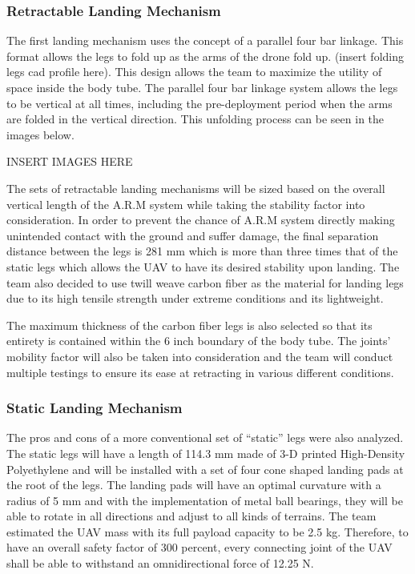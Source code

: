 		\subsubsection{Retractable Landing Mechanism}
			The first landing mechanism uses the concept of a parallel four bar linkage. This format allows the legs to fold up as the arms of the drone fold up. (insert folding legs cad profile here). This design allows the team to maximize the utility of space inside the body tube. The parallel four bar linkage system allows the legs to be vertical at all times, including the pre-deployment period when the arms are folded in the vertical direction. This unfolding process can be seen in the images below.

			INSERT IMAGES HERE

			The sets of retractable landing mechanisms will be sized based on the overall vertical length of the A.R.M system while taking the stability factor into consideration. In order to prevent the chance of A.R.M system directly making unintended contact with the ground and suffer damage, the final separation distance between the legs is 281 mm which is more than three times that of the static legs which allows the UAV to have its desired stability upon landing. The team also decided to use twill weave carbon fiber as the material for landing legs due to its high tensile strength under extreme conditions and its lightweight. 

			The maximum thickness of the carbon fiber legs is also selected so that its entirety is contained within the 6 inch boundary of the body tube. The joints’ mobility factor will also be taken into consideration and the team will conduct multiple testings to ensure its ease at retracting in various different conditions. 


		\subsubsection{Static Landing Mechanism}
			The pros and cons of a more conventional set of “static” legs were also analyzed. The static legs will have a length of 114.3 mm made of 3-D printed High-Density Polyethylene and will be installed with a set of four cone shaped landing pads at the root of the legs. The landing pads will have an optimal curvature with a radius of 5 mm and with the implementation of metal ball bearings, they will be able to rotate in all directions and adjust to all kinds of terrains. The team estimated the UAV mass with its full payload capacity to be 2.5 kg. Therefore, to have an overall safety factor of 300 percent, every connecting joint of the UAV shall be able to withstand an omnidirectional force of 12.25 N. 

